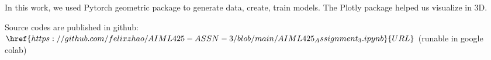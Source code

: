 \documentclass{article}
\begin{document}
In this work, we used Pytorch geometric package to generate data, create, train models. 
The Plotly package helped us visualize in 3D. 

Source codes are published in github: 
$\href{https://github.com/felixzhao/AIML425-ASSN-3/blob/main/AIML425_Assignment_3.ipynb}{URL}$
 (runable in google colab)




\vfill\pagebreak



\end{document}
